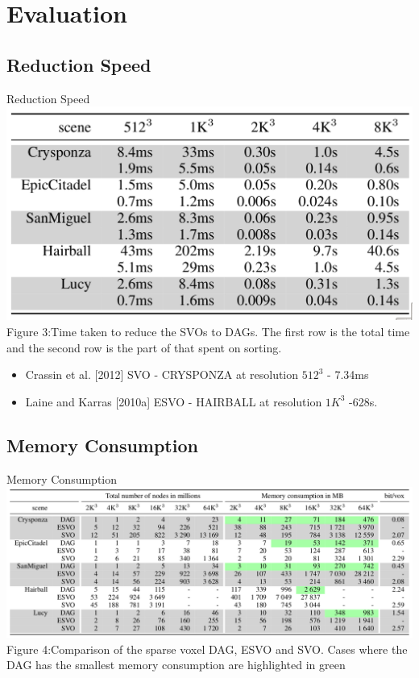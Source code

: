 \documentclass{beamer}
\begin{document}
\section{Evaluation}
\subsection{Reduction Speed}
\begin{frame}{Reduction Speed}
	\includegraphics[scale=0.23]{images/red-speed.png}{\\Figure 3:Time taken to reduce the SVOs to DAGs. The first row is the total time and the second row is the part of that spent on sorting.}
	\begin{itemize}
		\item Crassin et al. [2012] SVO - CRYSPONZA at resolution $512^3$ - 7.34ms
		\item Laine and Karras [2010a] ESVO - HAIRBALL at resolution $1K^3$ -628s.
	\end{itemize}
	
	
\end{frame}
\subsection{Memory Consumption}
\begin{frame}{Memory Consumption}
	\includegraphics[scale=0.27]{images/mem-consumption.png}{\\Figure 4:Comparison of the sparse voxel DAG, ESVO and SVO. Cases where the DAG has the smallest memory consumption are highlighted in green}
\end{frame}
\end{document}
